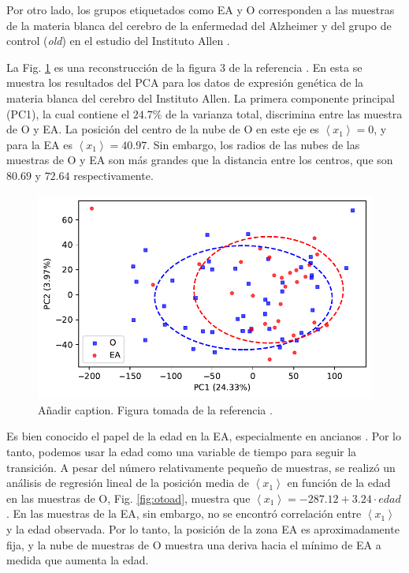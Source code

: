 Por otro lado, los grupos etiquetados como EA y O corresponden a las muestras de la materia blanca del cerebro de la enfermedad del Alzheimer y del grupo de control (\textit{old}) en el estudio del Instituto Allen \cite{Miller_2017}. 

La Fig. \ref{fig:pcaotoad} es una reconstrucción de la figura 3 de la referencia \cite{Gonzalez_2021}. En esta se muestra los resultados del PCA para los datos de expresión genética de la materia blanca del cerebro del Instituto Allen. La primera componente principal (PC1), la cual contiene el $24.7 \%$ de la varianza total, discrimina entre las muestra de O y EA. La posición del centro de la nube de O en este eje es $\left\langle x_1 \right\rangle  = 0 $, y para la EA es $\left\langle x_1 \right\rangle = 40.97 $. Sin embargo, los radios de las nubes de las muestras de O y EA son más grandes que la distancia entre los centros, que son $80.69$ y $72.64$ respectivamente.

\begin{figure}[!htb]
	\centering
	\includegraphics[width=0.75\linewidth]{figures/pca_o_to_ad_1}
	\caption{\alert{Añadir caption}. Figura tomada de la referencia \cite{Gonzalez_2021}.}
	\label{fig:pcaotoad}
\end{figure}

Es bien conocido el papel de la edad en la EA, especialmente en ancianos \cite{alz2019}. Por lo tanto, podemos usar la edad como una variable de tiempo para seguir la transición. A pesar del número relativamente pequeño de muestras, se realizó un análisis de regresión lineal de la posición media de $\left\langle x_1 \right\rangle$ en función de la edad en las muestras de O, Fig. \ref{fig:otoad}, muestra que $\left\langle x_1 \right\rangle = -287.12 + 3.24 \cdot edad$. En las muestras de la EA, sin embargo, no se encontró correlación entre $\left\langle x_1 \right\rangle$ y la edad observada. Por lo tanto, la posición de la zona EA es aproximadamente fija, y la nube de muestras de O muestra una deriva hacia el mínimo de EA a medida que aumenta la edad.

